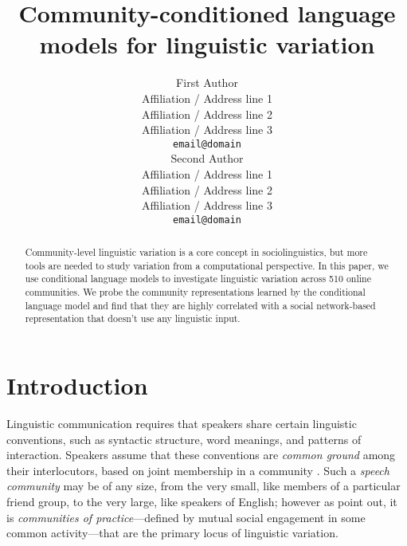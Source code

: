 \documentclass[11pt]{article}
\title{Community-conditioned language models for linguistic variation}
\author{First Author \\
  Affiliation / Address line 1 \\
  Affiliation / Address line 2 \\
  Affiliation / Address line 3 \\
  \texttt{email@domain} \\\And
  Second Author \\
  Affiliation / Address line 1 \\
  Affiliation / Address line 2 \\
  Affiliation / Address line 3 \\
  \texttt{email@domain} \\}
\date{}
\begin{document}
\maketitle
\begin{abstract}
  Community-level linguistic variation is a core concept in sociolinguistics,
  but more tools are needed to study variation from a computational perspective.
  In this paper, we use conditional language models to investigate linguistic variation
  across 510 online communities.
  We probe the community representations learned by the conditional language model
  and find that they are highly correlated with a social network-based 
  representation that doesn't use any linguistic input.
\end{abstract}








\section{Introduction}

Linguistic communication requires that speakers share
certain linguistic conventions, such as syntactic
structure, word meanings, and patterns of interaction.
Speakers assume that these conventions are \emph{common ground} among
their interlocutors, based on joint membership in a community
\cite{Stalnaker2002, Clark1996}.  Such a \emph{speech community} \citep{Gumperz1972} 
may be of any size, from the very small, like members of a particular friend group, 
to the very large, like speakers of English; however as \citet{Eckert1992}
point out, it is \emph{communities of practice}---defined by mutual social engagement
in some common activity---that are the primary locus of linguistic variation.
\end{document}
